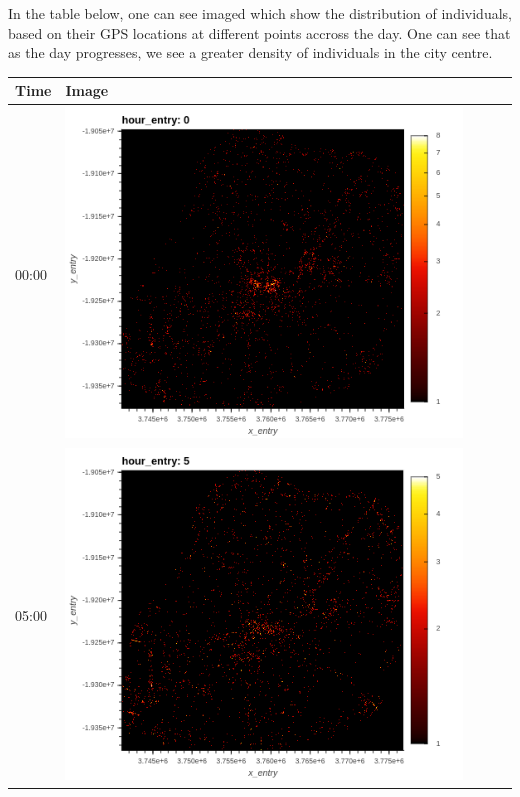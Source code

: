 \documentclass[12pt]{report}
\begin{document}
In the table below, one can see imaged which show the distribution of individuals, based on their GPS locations at different points accross the day.  One can see that as the day progresses, we see a greater density of individuals in the city centre.  \\
\begin{center}
\begin{tabular}{|l|l|l|l|l|}
\hline
\textbf{Time} & \textbf{Image}\\
\hline
00:00 & \includegraphics[scale=0.35]{./images/bokeh_plot_(1).png} \\
\hline
05:00 & \includegraphics[scale=0.35]{./images/bokeh_plot_(2).png} \\

\end{tabular}
\end{center}
\end{document}
